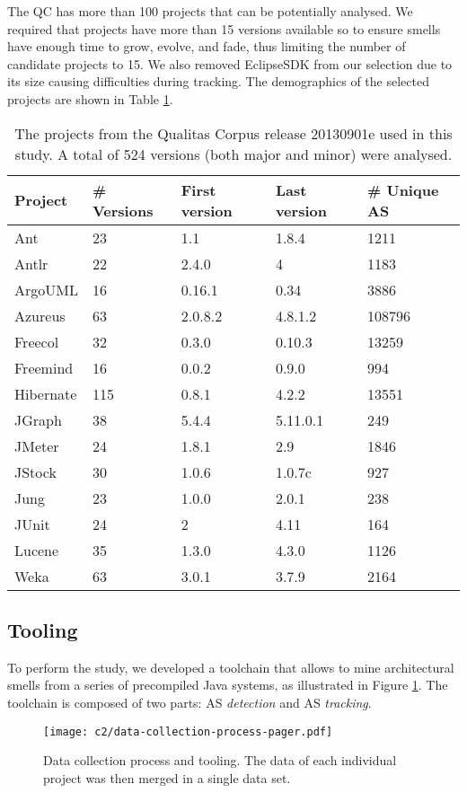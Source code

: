 The QC has more than 100 projects that can be potentially analysed. We required that projects have more than 15 versions available so to ensure smells have enough time to grow, evolve, and fade, thus limiting  the number of candidate projects to 15.
We also removed EclipseSDK from our selection due to its size causing difficulties during tracking.
The demographics of the selected projects are shown in Table \ref{tab:projects}.

\begin{table}[]
    \centering
    \caption{The projects from the Qualitas Corpus release 20130901e used in this study. A total of 524 versions (both major and minor) were analysed.}
    \label{tab:projects}
    \begin{tabular}{@{}lllll@{}}
    \toprule
    \textbf{Project} & \textbf{\# Versions} & \textbf{First version} & \textbf{Last version} & \textbf{\# Unique AS} \\ \midrule
    Ant & 23 & 1.1 & 1.8.4 & 1211\\
    Antlr & 22 & 2.4.0 & 4 & 1183 \\
    ArgoUML & 16 & 0.16.1 & 0.34 & 3886 \\
    Azureus & 63 & 2.0.8.2 & 4.8.1.2 & 108796 \\
    Freecol & 32 & 0.3.0 & 0.10.3 & 13259 \\
    Freemind & 16 & 0.0.2 & 0.9.0 & 994 \\
    Hibernate & 115 & 0.8.1 & 4.2.2 & 13551\\
    JGraph & 38 & 5.4.4 & 5.11.0.1 & 249\\
    JMeter & 24 & 1.8.1 & 2.9 & 1846\\
    JStock & 30 & 1.0.6 & 1.0.7c & 927 \\
    Jung & 23 & 1.0.0 & 2.0.1 & 238 \\
    JUnit & 24 & 2 & 4.11 & 164 \\
    Lucene & 35 & 1.3.0 & 4.3.0 & 1126 \\
    Weka & 63 & 3.0.1 & 3.7.9 & 2164 \\ \bottomrule
    \end{tabular}
\end{table}

\subsection{Tooling}
To perform the study, we developed a toolchain that allows to mine architectural smells from a series of precompiled Java systems, as illustrated in Figure \ref{c2:fig:data-collection}.
The toolchain is composed of two parts: AS \emph{detection} and AS \emph{tracking}.
\begin{figure}
    \centering
    \texttt{[image: c2/data-collection-process-pager.pdf]}
    \caption{Data collection process and tooling. The data of each individual project was then merged in a single data set.}\label{c2:fig:data-collection}
\end{figure}
